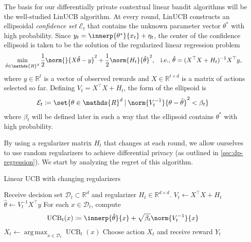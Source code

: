\documentclass{article}
\newcommand{\defeq}{\coloneq}
\newcommand{\inv}[1]{#1^{-1}}
\newcommand{\Real}{\mathds{R}}
\newcommand{\UCB}{\operatorname{UCB}}
\DeclareMathOperator*{\argmax}{arg\,max}
\newcommand\given[1][\delimsize]{%
  \providecommand{\delimsize}{}
  \nonscript\:#1\vert\allowbreak\nonscript\:\mathopen{}
}
\newcommand{\E}{\mathcal{E}}
\providecommand\transp{\top}
\let\transpsymbol\transp
\renewcommand{\transp}[1]{#1^\transpsymbol}
\newcommand{\Dset}[1]{\mathcal{D}_{#1}}
\begin{document}

The basis for our differentially private contextual linear bandit
algorithms will be the well-studied LinUCB  algorithm.
At every round, LinUCB constructs an ellipsoidal \emph{confidence set}
$\E_t$ that contains the unknown parameter vector $\theta^*$ with high
probability.  Since $y_t = \innerp{\theta^*}{x_t} + \eta_t$, the center of
the confidence ellipsoid is taken to be the solution of the
regularized linear regression problem
\begin{align*}
  &\min_{\hat\theta \in \Real^d} \frac{1}{2}\norm{}{X\hat\theta - y}^2 + \frac{1}{2}\norm{H_t}{\hat\theta}^2,
  && \text{i.e., } \hat\theta = \inv{(\transp{X}X + H_t)}\transp{X}y,
\end{align*}
where $y\in\Real^t$ is a vector of observed rewards and
$X\in\Real^{t\times d}$ is a matrix of actions selected so far.
Defining $V_t = \transp{X}X + H_t$, the form of the ellipsoid is
\begin{align*}
  \E_t &\defeq \set{\theta\in\Real^d \given \norm{\inv{V_t}}{\theta-\hat\theta}^2 < \beta_t}
\end{align*}
where $\beta_t$ will be defined later in such a way that the ellipsoid
contains $\theta^*$ with high probability.

By using a regularizer matrix $H_t$ that changes at each round, we
allow ourselves to use random regularizers to achieve differential
privacy (as outlined in \cref{sec:dp-regression}).  We start by
analyzing the regret of this algorithm.

\begin{algorithm}
  \caption{Linear UCB with changing regularizers}\label{alg:linucb}
  \begin{algorithmic}
    \State Receive decision set $\Dset{t} \subset \Real^d$ and
    regularizer $H_t \in \Real^{d\times d}$.
    \State $V_t \gets \transp{X}X + H_t$
    \State $\hat\theta \gets \inv{V_t}\transp{X}y$
    \State For each $x\in\Dset{t}$, compute
    \begin{align*}
      \UCB_t(x) &\defeq \innerp{\hat\theta}{x} + \sqrt{\beta_t}\norm{\inv{V_t}}{x}
    \end{align*}
    \State $X_t \gets \argmax_{x\in\Dset{t}} \UCB_t(x)$
    \State Choose action $X_t$ and receive reward $Y_t$
    \EndFor
  \end{algorithmic}
\end{algorithm}
\end{document}
